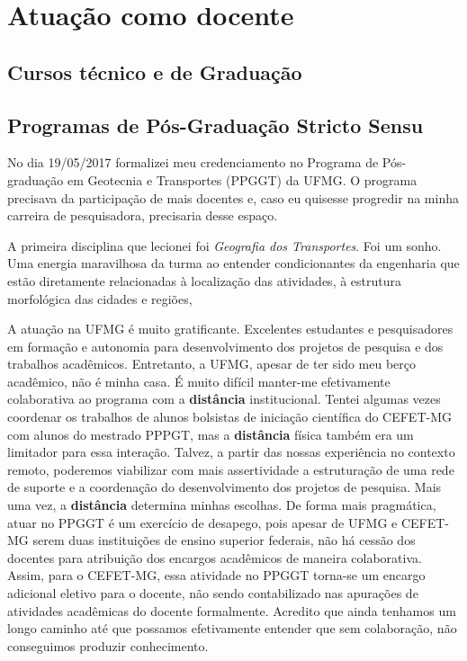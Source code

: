 \documentclass[
]{book}
\begin{document}
\hypertarget{atuauxe7uxe3o-como-docente}{%
\section{Atuação como docente}\label{atuauxe7uxe3o-como-docente}}

\hypertarget{cursos-tuxe9cnico-e-de-graduauxe7uxe3o}{%
\subsection{Cursos técnico e de
Graduação}\label{cursos-tuxe9cnico-e-de-graduauxe7uxe3o}}

\hypertarget{programas-de-puxf3s-graduauxe7uxe3o-stricto-sensu}{%
\subsection{Programas de Pós-Graduação Stricto
Sensu}\label{programas-de-puxf3s-graduauxe7uxe3o-stricto-sensu}}

No dia 19/05/2017 formalizei meu credenciamento no Programa de
Pós-graduação em Geotecnia e Transportes (PPGGT) da UFMG. O programa
precisava da participação de mais docentes e, caso eu quisesse progredir
na minha carreira de pesquisadora, precisaria desse espaço.

A primeira disciplina que lecionei foi \emph{Geografia dos Transportes}.
Foi um sonho. Uma energia maravilhosa da turma ao entender
condicionantes da engenharia que estão diretamente relacionadas à
localização das atividades, à estrutura morfológica das cidades e
regiões,

A atuação na UFMG é muito gratificante. Excelentes estudantes e
pesquisadores em formação e autonomia para desenvolvimento dos projetos
de pesquisa e dos trabalhos acadêmicos. Entretanto, a UFMG, apesar de
ter sido meu berço acadêmico, não é minha casa. É muito difícil
manter-me efetivamente colaborativa ao programa com a \textbf{distância}
institucional. Tentei algumas vezes coordenar os trabalhos de alunos
bolsistas de iniciação científica do CEFET-MG com alunos do mestrado
PPPGT, mas a \textbf{distância} física também era um limitador para essa
interação. Talvez, a partir das nossas experiência no contexto remoto,
poderemos viabilizar com mais assertividade a estruturação de uma rede
de suporte e a coordenação do desenvolvimento dos projetos de pesquisa.
Mais uma vez, a \textbf{distância} determina minhas escolhas. De forma
mais pragmática, atuar no PPGGT é um exercício de desapego, pois apesar
de UFMG e CEFET-MG serem duas instituições de ensino superior federais,
não há cessão dos docentes para atribuição dos encargos acadêmicos de
maneira colaborativa. Assim, para o CEFET-MG, essa atividade no PPGGT
torna-se um encargo adicional eletivo para o docente, não sendo
contabilizado nas apurações de atividades acadêmicas do docente
formalmente. Acredito que ainda tenhamos um longo caminho até que
possamos efetivamente entender que sem colaboração, não conseguimos
produzir conhecimento.
\end{document}

